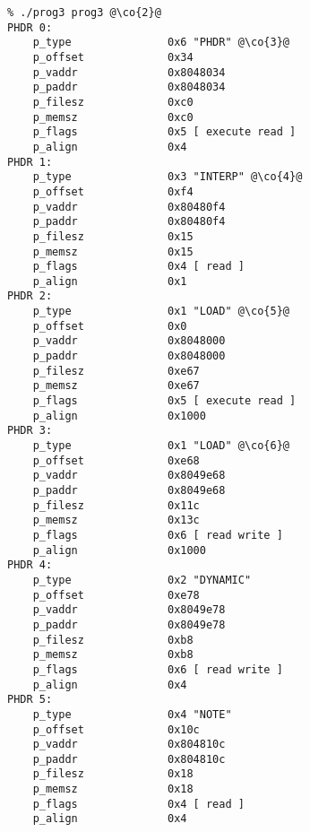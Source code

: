 \documentclass[a4paper,pdftex]{book}
\makeatletter
\newenvironment{callout}[2][black]{%
  \begingroup\newcommand{\@cocolor}{#1}%
  \setlength{\shadowsize}{1.2pt}%
  \newcommand{\@cogroup}[1]{#2}}{\endgroup}
\newcommand{\@co}[1]{\shadowbox{\color{\@cocolor}#1}}
\newcommand{\co}[1]{%
  \hypertarget{\@cogroup.#1.co}{%
    \hyperlink{\@cogroup.#1.cr}{\@co{#1}}}}
\makeatother
\begin{document}
\begin{callout}{scr3}
  \begin{lstlisting}[language={}, basicstyle=\small\ttfamily,
      label=scr.prog3, caption=Compiling and Running prog3]
% cc -o prog3 prog3.c -lelf @\co{1}@
% ./prog3 prog3 @\co{2}@
PHDR 0:
    p_type               0x6 "PHDR" @\co{3}@
    p_offset             0x34
    p_vaddr              0x8048034
    p_paddr              0x8048034
    p_filesz             0xc0
    p_memsz              0xc0
    p_flags              0x5 [ execute read ]
    p_align              0x4
PHDR 1:
    p_type               0x3 "INTERP" @\co{4}@
    p_offset             0xf4
    p_vaddr              0x80480f4
    p_paddr              0x80480f4
    p_filesz             0x15
    p_memsz              0x15
    p_flags              0x4 [ read ]
    p_align              0x1
PHDR 2:
    p_type               0x1 "LOAD" @\co{5}@
    p_offset             0x0
    p_vaddr              0x8048000
    p_paddr              0x8048000
    p_filesz             0xe67
    p_memsz              0xe67
    p_flags              0x5 [ execute read ]
    p_align              0x1000
PHDR 3:
    p_type               0x1 "LOAD" @\co{6}@
    p_offset             0xe68
    p_vaddr              0x8049e68
    p_paddr              0x8049e68
    p_filesz             0x11c
    p_memsz              0x13c
    p_flags              0x6 [ read write ]
    p_align              0x1000
PHDR 4:
    p_type               0x2 "DYNAMIC"
    p_offset             0xe78
    p_vaddr              0x8049e78
    p_paddr              0x8049e78
    p_filesz             0xb8
    p_memsz              0xb8
    p_flags              0x6 [ read write ]
    p_align              0x4
PHDR 5:
    p_type               0x4 "NOTE"
    p_offset             0x10c
    p_vaddr              0x804810c
    p_paddr              0x804810c
    p_filesz             0x18
    p_memsz              0x18
    p_flags              0x4 [ read ]
    p_align              0x4
  \end{lstlisting}


\end{callout}
\end{document}

